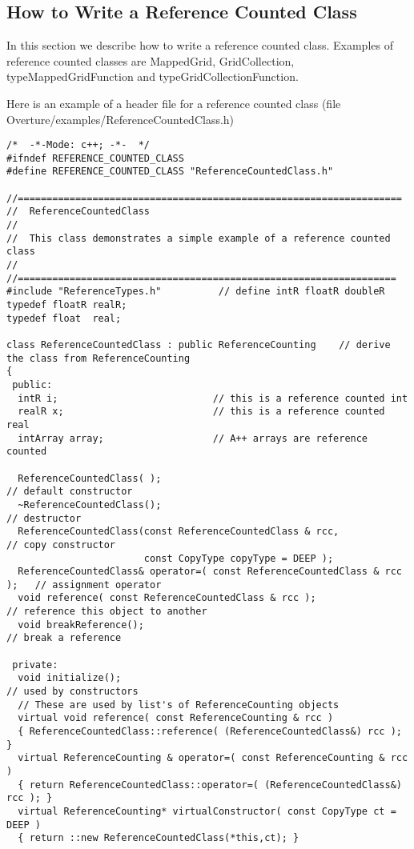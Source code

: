 \subsection{How to Write a Reference Counted Class}

In this section we describe how to write a reference
counted class. Examples of reference counted classes
are {\ff MappedGrid}, {\ff GridCollection}, 
{\ff typeMappedGridFunction} and {\ff typeGridCollectionFunction}.


Here is an example of a header file for a reference counted
class
(file {\ff Overture/examples/Reference\-Counted\-Class.h})
{\footnotesize
\begin{verbatim}
/*  -*-Mode: c++; -*-  */
#ifndef REFERENCE_COUNTED_CLASS
#define REFERENCE_COUNTED_CLASS "ReferenceCountedClass.h"

//===================================================================
//  ReferenceCountedClass
//
//  This class demonstrates a simple example of a reference counted class
//
//==================================================================
#include "ReferenceTypes.h"          // define intR floatR doubleR
typedef floatR realR;
typedef float  real;

class ReferenceCountedClass : public ReferenceCounting    // derive the class from ReferenceCounting
{
 public:
  intR i;                           // this is a reference counted int
  realR x;                          // this is a reference counted real
  intArray array;                   // A++ arrays are reference counted

  ReferenceCountedClass( );                                                // default constructor
  ~ReferenceCountedClass();                                                // destructor
  ReferenceCountedClass(const ReferenceCountedClass & rcc,                 // copy constructor
                        const CopyType copyType = DEEP );
  ReferenceCountedClass& operator=( const ReferenceCountedClass & rcc );   // assignment operator
  void reference( const ReferenceCountedClass & rcc );                     // reference this object to another
  void breakReference();                                                   // break a reference

 private:
  void initialize();                                                       // used by constructors
  // These are used by list's of ReferenceCounting objects
  virtual void reference( const ReferenceCounting & rcc )
  { ReferenceCountedClass::reference( (ReferenceCountedClass&) rcc ); }
  virtual ReferenceCounting & operator=( const ReferenceCounting & rcc )
  { return ReferenceCountedClass::operator=( (ReferenceCountedClass&) rcc ); }
  virtual ReferenceCounting* virtualConstructor( const CopyType ct = DEEP )
  { return ::new ReferenceCountedClass(*this,ct); }  


\end{verbatim}}
